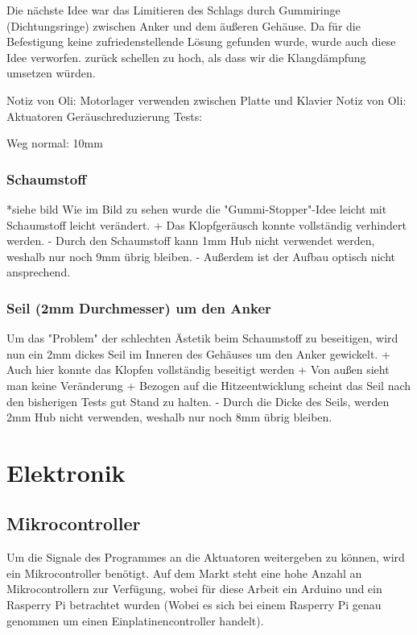 Die nächste Idee war das Limitieren des Schlags durch Gummiringe (Dichtungsringe) zwischen Anker und dem äußeren Gehäuse.
Da für die Befestigung keine zufriedenstellende Lösung gefunden wurde, wurde auch diese Idee verworfen.
zurück schellen zu hoch, als dass wir die Klangdämpfung umsetzen würden.

Notiz von Oli: Motorlager verwenden zwischen Platte und Klavier
Notiz von Oli:
Aktuatoren Geräuschreduzierung Tests:

Weg normal: 10mm

\subsubsection{Schaumstoff}

*siehe bild
Wie im Bild zu sehen wurde die "Gummi-Stopper"-Idee leicht mit Schaumstoff leicht verändert.
+ Das Klopfgeräusch konnte vollständig verhindert werden.
- Durch den Schaumstoff kann 1mm Hub nicht verwendet werden, weshalb nur noch 9mm übrig bleiben.
- Außerdem ist der Aufbau optisch nicht ansprechend.


\subsubsection{Seil (2mm Durchmesser) um den Anker}

Um das "Problem" der schlechten Ästetik beim Schaumstoff zu beseitigen, wird nun ein 2mm dickes Seil im Inneren des Gehäuses um den Anker gewickelt.
+ Auch hier konnte das Klopfen vollständig beseitigt werden
+ Von außen sieht man keine Veränderung
+ Bezogen auf die Hitzeentwicklung scheint das Seil nach den bisherigen Tests gut Stand zu halten.
- Durch die Dicke des Seils, werden 2mm Hub nicht verwenden, weshalb nur noch 8mm übrig bleiben.


\section{Elektronik}\label{Vorgehen - Hardware}


\subsection{Mikrocontroller}\label{Ansteuerung}
Um die Signale des Programmes an die Aktuatoren weitergeben zu können, wird ein Mikrocontroller benötigt.
Auf dem Markt steht eine hohe Anzahl an Mikrocontrollern zur Verfügung, wobei für diese Arbeit ein Arduino und ein
Rasperry Pi betrachtet wurden (Wobei es sich bei einem Rasperry Pi genau genommen um einen Einplatinencontroller
handelt). \newline

